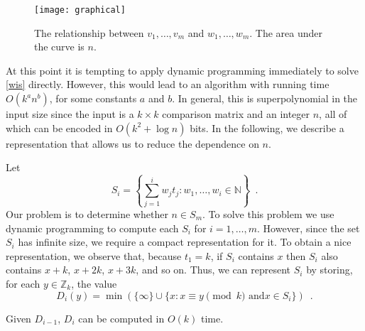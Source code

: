 \documentclass[11pt]{patmorin}
\newcommand{\Z}{\mathbb{Z}}
\begin{document}
\begin{figure}
\begin{center}\texttt{[image: graphical]}\end{center}
\caption{The relationship between $v_1,\ldots,v_m$ and
$w_1,\ldots,w_m$. The area under the
curve is $n$.} 
\end{figure}

At this point it is tempting to apply dynamic programming immediately
to solve \eqref{wis} directly.  However, this would lead to an
algorithm with running time $O(k^a n^b)$, for some constants $a$ and
$b$.  In general, this is superpolynomial in the input size since the
input is a $k\times k$ comparison matrix and an integer $n$, all of
which can be encoded in $O(k^2 + \log n)$ bits.  In the following, we
describe a representation that allows us to reduce the dependence
on $n$.

Let 
\[ S_i = \left\{\sum_{j=1}^i w_jt_j : 
        w_1,\ldots,w_i\in \mathbb{N} \right\} 
\enspace .
\]
Our problem is to determine whether $n\in S_m$.
To solve this problem we use dynamic programming to compute each $S_i$ for
$i=1,\ldots,m$.  However, since the set $S_i$ has infinite size, we
require a compact representation for it.  To obtain a nice
representation, we observe that, because $t_1=k$, if $S_i$ contains
$x$ then $S_i$ also contains $x+k$, $x+2k$, $x+3k$, and so on.  Thus,
we can represent $S_i$ by storing, for each $y\in \Z_k$,
the value 
\[
   D_{i}(y) = \min (\{\infty\}\cup\{x: \mbox{$x\equiv y\pmod k$ and
$x\in S_i$} \}) \enspace . 
\]
\begin{lem}
Given $D_{i-1}$, $D_i$ can be computed in $O(k)$ time.
\end{lem}
\end{document}
